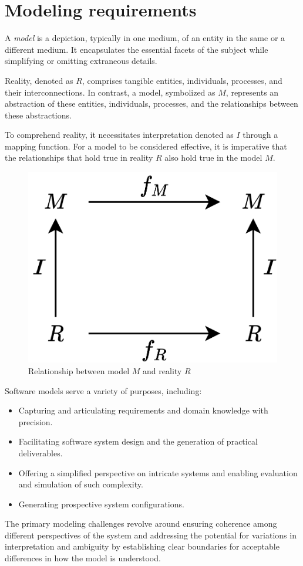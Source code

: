 \section{Modeling requirements}

\begin{definition}
    A \emph{model} is a depiction, typically in one medium, of an entity in the same or a different medium.
    It encapsulates the essential facets of the subject while simplifying or omitting extraneous details.
\end{definition}
Reality, denoted as $R$, comprises tangible entities, individuals, processes, and their interconnections. 
In contrast, a model, symbolized as $M$, represents an abstraction of these entities, individuals, processes, and the relationships between these abstractions.

To comprehend reality, it necessitates interpretation denoted as $I$ through a mapping function.
For a model to be considered effective, it is imperative that the relationships that hold true in reality $R$ also hold true in the model $M$.
\begin{figure}[H]
    \centering
    \includegraphics[width=0.35\linewidth]{images/modeling.png}
    \caption{Relationship between model $M$ and reality $R$}
\end{figure}
Software models serve a variety of purposes, including:
\begin{itemize}
    \item Capturing and articulating requirements and domain knowledge with precision.
    \item Facilitating software system design and the generation of practical deliverables.
    \item Offering a simplified perspective on intricate systems and enabling evaluation and simulation of such complexity.
    \item Generating prospective system configurations.
\end{itemize}
The primary modeling challenges revolve around ensuring coherence among different perspectives of the system and addressing the potential for variations in interpretation and ambiguity by establishing clear boundaries for acceptable differences in how the model is understood.
 
